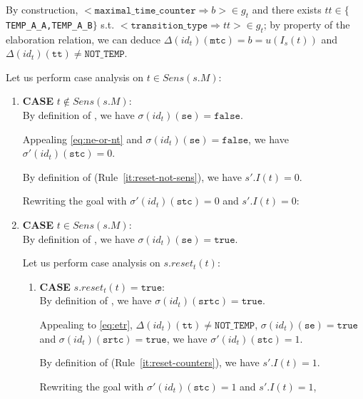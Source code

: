 \documentclass[dvipsnames,12pt]{article}
\begin{document}
\begin{niproof}
\begin{enumerate}
      By construction,
      ${<}\mathtt{maximal\_time\_counter\Rightarrow}b{>}\in{}g_t$ and
      there exists $tt\in\{$\texttt{TEMP\_A\_A,TEMP\_A\_B}$\}$ s.t.
      ${<}\mathtt{transition\_type\Rightarrow}tt{>}\in{}g_t$; by
      property of the elaboration relation, we can deduce
      $\Delta(id_t)(\texttt{mtc})=b=u(I_s(t))$ and
      $\Delta(id_t)(\texttt{tt})\neq\mathtt{NOT\_TEMP}$.
      
      Let us perform case analysis on $t\in{}Sens(s.M)$:
      \begin{enumerate}
      \item \textbf{CASE} $t\notin{}Sens(s.M)$:\\
        
        By definition of \upSim, we have
        $\sigma(id_t)(\texttt{se})=\mathtt{false}$.

        \noindent{}Appealing \eqref{eq:ne-or-nt} and
        $\sigma(id_t)(\texttt{se})=\mathtt{false}$, we have
        $\sigma'(id_t)(\texttt{stc})=0$.

        By definition of \dwSitpn (Rule~\ref{it:reset-not-sens}), we
        have $s'.I(t)=0$.

        Rewriting the goal with $\sigma'(id_t)(\texttt{stc})=0$ and
        $s'.I(t)=0$: 
        
      \item \textbf{CASE} $t\in{}Sens(s.M)$:\\
        
        By definition of \upSim, we have
        $\sigma(id_t)(\texttt{se})=\mathtt{true}$.

        Let us perform case analysis on $s.reset_t(t)$:
        \begin{enumerate}
        \item \textbf{CASE} $s.reset_t(t)=\mathtt{true}$:\\
          
          By definition of \upSim, we have
          $\sigma(id_t)(\texttt{srtc})=\mathtt{true}$.

          Appealing to \eqref{eq:etr},
          $\Delta(id_t)(\texttt{tt})\neq\mathtt{NOT\_TEMP}$,
          $\sigma(id_t)(\texttt{se})=\mathtt{true}$ and
          $\sigma(id_t)(\texttt{srtc})=\mathtt{true}$, we have
          $\sigma'(id_t)(\texttt{stc})=1$.

          By definition of \dwSitpn (Rule~\ref{it:reset-counters}), we
          have $s'.I(t)=1$.

          Rewriting the goal with $\sigma'(id_t)(\texttt{stc})=1$ and
          $s'.I(t)=1$, 
          

\end{enumerate}
\end{enumerate}
\end{enumerate}
\end{niproof}
\end{document}
